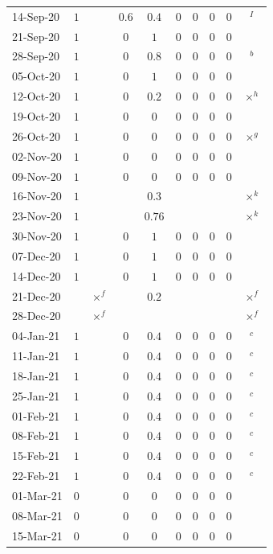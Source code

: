 \documentclass[fleqn,10pt]{wlscirep}
\begin{document}
\begin{table}
\begin{center}
{\begin{tabular}{l|cc|ccccccc}
14-Sep-20	&$1$	&		&$0.6$	&$0.4$	&$0$	&$0$	&$0$	&$0$	&$^{I}$	\\
21-Sep-20	&$1$	&		&$0$	&$1$	&$0$	&$0$	&$0$	&$0$	&	\\
28-Sep-20	&$1$	&		&$0$	&$0.8$	&$0$	&$0$	&$0$	&$0$	&$^{b}$	\\
05-Oct-20	&$1$	&		&$0$	&$1$	&$0$	&$0$	&$0$	&$0$	&	\\
12-Oct-20	&$1$	&		&$0$	&$0.2$	&$0$	&$0$	&$0$	&$0$	&$\times^{h}$	\\
19-Oct-20	&$1$	&		&$0$	&$0$	&$0$	&$0$	&$0$	&$0$	&	\\
26-Oct-20	&$1$	&		&$0$	&$0$	&$0$	&$0$	&$0$	&$0$	&$\times^{g}$	\\
02-Nov-20	&$1$	&		&$0$	&$0$	&$0$	&$0$	&$0$	&$0$	&	\\
09-Nov-20	&$1$	&		&$0$	&$0$	&$0$	&$0$	&$0$	&$0$	&	\\
16-Nov-20	&$1$	&		&	&$0.3$	&	&	&	&	&$\times^{k}$	\\
23-Nov-20	&$1$	&		&	&$0.76$	&	&	&	&	&$\times^{k}$	\\
30-Nov-20	&$1$	&		&$0$	&$1$	&$0$	&$0$	&$0$	&$0$	&	\\
07-Dec-20	&$1$	&		&$0$	&$1$	&$0$	&$0$	&$0$	&$0$	&	\\
14-Dec-20	&$1$	&		&$0$	&$1$	&$0$	&$0$	&$0$	&$0$	&	\\
21-Dec-20	&	&$\times^{f}$		&	&$0.2$	&	&	&	&	&$\times^{f}$	\\
28-Dec-20	&	&$\times^{f}$		&	&	&	&	&	&	&$\times^{f}$	\\
04-Jan-21	&$1$	&		&$0$	&$0.4$	&$0$	&$0$	&$0$	&$0$	&$^{c}$	\\
11-Jan-21	&$1$	&		&$0$	&$0.4$	&$0$	&$0$	&$0$	&$0$	&$^{c}$	\\
18-Jan-21	&$1$	&		&$0$	&$0.4$	&$0$	&$0$	&$0$	&$0$	&$^{c}$	\\
25-Jan-21	&$1$	&		&$0$	&$0.4$	&$0$	&$0$	&$0$	&$0$	&$^{c}$	\\
01-Feb-21	&$1$	&		&$0$	&$0.4$	&$0$	&$0$	&$0$	&$0$	&$^{c}$	\\
08-Feb-21	&$1$	&		&$0$	&$0.4$	&$0$	&$0$	&$0$	&$0$	&$^{c}$	\\
15-Feb-21	&$1$	&		&$0$	&$0.4$	&$0$	&$0$	&$0$	&$0$	&$^{c}$	\\
22-Feb-21	&$1$	&		&$0$	&$0.4$	&$0$	&$0$	&$0$	&$0$	&$^{c}$	\\
01-Mar-21	&$0$	&		&$0$	&$0$	&$0$	&$0$	&$0$	&$0$	&	\\
08-Mar-21	&$0$	&		&$0$	&$0$	&$0$	&$0$	&$0$	&$0$	&	\\
15-Mar-21	&$0$	&		&$0$	&$0$	&$0$	&$0$	&$0$	&$0$	&	\\

\end{tabular}}
\end{center}
\end{table}
\end{document}
